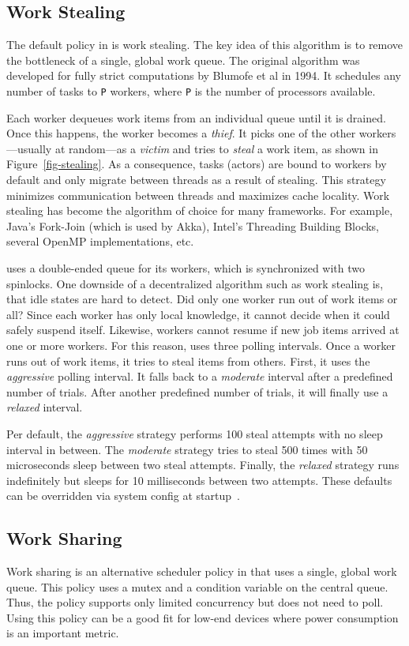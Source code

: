 \subsection{Work Stealing}
\label{work-stealing}

The default policy in \lib is work stealing. The key idea of this algorithm is to remove the bottleneck of a single, global work queue.  The original algorithm was developed for fully strict computations by Blumofe et al in 1994. It schedules any number of tasks to \lstinline^P^ workers, where \lstinline^P^ is the number of processors available.


Each worker dequeues work items from an individual queue until it is drained. Once this happens, the worker becomes a \emph{thief}. It picks one of the other workers---usually at random---as a \emph{victim} and tries to \emph{steal} a work item, as shown in Figure~\ref{fig-stealing}. As a consequence, tasks (actors) are bound to workers by default and only migrate between threads as a result of stealing. This strategy minimizes communication between threads and maximizes cache locality. Work stealing has become the algorithm of choice for many frameworks. For example, Java's Fork-Join (which is used by Akka), Intel's Threading Building Blocks, several OpenMP implementations, etc.

\lib uses a double-ended queue for its workers, which is synchronized with two spinlocks. One downside of a decentralized algorithm such as work stealing is, that idle states are hard to detect. Did only one worker run out of work items or all? Since each worker has only local knowledge, it cannot decide when it could safely suspend itself. Likewise, workers cannot resume if new job items arrived at one or more workers. For this reason, \lib uses three polling intervals. Once a worker runs out of work items, it tries to steal items from others. First, it uses the \emph{aggressive} polling interval. It falls back to a \emph{moderate} interval after a predefined number of trials. After another predefined number of trials, it will finally use a \emph{relaxed} interval.

Per default, the \emph{aggressive} strategy performs 100 steal attempts with no sleep interval in between. The \emph{moderate} strategy tries to steal 500 times with 50 microseconds sleep between two steal attempts. Finally, the \emph{relaxed} strategy runs indefinitely but sleeps for 10 milliseconds between two attempts. These defaults can be overridden via system config at startup~.

\subsection{Work Sharing}
\label{work-sharing}

Work sharing is an alternative scheduler policy in \lib that uses a single, global work queue. This policy uses a mutex and a condition variable on the central queue. Thus, the policy supports only limited concurrency but does not need to poll. Using this policy can be a good fit for low-end devices where power consumption is an important metric.

